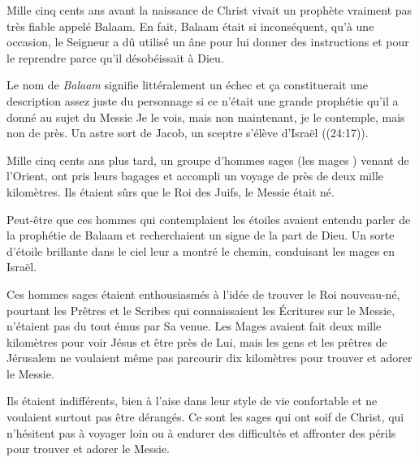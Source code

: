 

Mille cinq cents ans avant la naissance de Christ vivait un prophète vraiment pas très fiable appelé Balaam. En fait, Balaam était si inconséquent, qu'à une occasion, le Seigneur a dû utilisé un âne pour lui donner des instructions et pour le reprendre parce qu'il désobéissait à Dieu.

Le nom de \emph{Balaam} signifie littéralement \og un échec \fg{} et ça constituerait une description assez juste du personnage si ce n'était une grande prophétie qu'il a donné au sujet du Messie\frcolon{} \og Je le vois, mais non maintenant, je le contemple, mais non de près. Un astre sort de Jacob, un sceptre s’élève d’Israël \fg{} ((24:17)).

Mille cinq cents ans plus tard, un groupe d'hommes sages (\og les mages \fg{}) venant de l'Orient, ont pris leurs bagages et accompli un voyage de près de deux mille kilomètres. Ils étaient sûrs que le Roi des Juifs, le Messie était né.

Peut-être que ces hommes qui contemplaient les étoiles avaient entendu parler de la prophétie de Balaam et recherchaient un signe de la part de Dieu. Un sorte d'étoile brillante dans le ciel leur a montré le chemin, conduisant les mages en Israël.

Ces hommes sages étaient enthousiasmés à l'idée de trouver le Roi nouveau-né, pourtant les Prêtres et le Scribes qui connaissaient les Écritures sur le Messie, n'étaient pas du tout émus par Sa venue. Les Mages avaient fait deux mille kilomètres pour voir Jésus et être près de Lui, mais les gens et les prêtres de Jérusalem ne voulaient même pas parcourir dix kilomètres pour trouver et adorer le Messie.

Ils étaient indifférents, bien à l'aise dans leur style de vie confortable et ne voulaient surtout pas être dérangés. Ce sont les sages qui ont soif de Christ, qui n'hésitent pas à voyager loin ou à endurer des difficultés et affronter des périls pour trouver et adorer le Messie.

